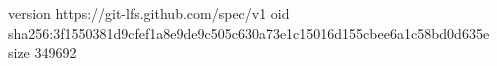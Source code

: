 version https://git-lfs.github.com/spec/v1
oid sha256:3f1550381d9cfef1a8e9de9c505c630a73e1c15016d155cbee6a1c58bd0d635e
size 349692
